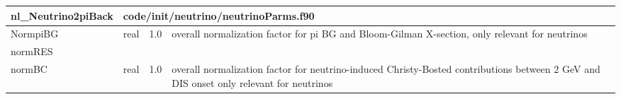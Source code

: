 \documentclass{article}
\begin{document}
\begin{longtable}{llll}
\toprule
\textbf{\large{nl\_Neutrino2piBack}} & \multicolumn{3}{l}{\footnotesize{code/init/neutrino/neutrinoParms.f90}}\\*
\midrule
\endfirsthead
\midrule
\endhead
NormpiBG & \begin{minipage}[t]{2cm}real\end{minipage} & \begin{minipage}[t]{2cm}1.0\end{minipage} & \begin{minipage}[t]{12cm}overall normalization factor for pi BG and Bloom-Gilman X-section, only relevant for neutrinos\end{minipage}\\*
\midrule
normRES & \begin{minipage}[t]{2cm}\end{minipage} & \begin{minipage}[t]{2cm}\end{minipage} & \begin{minipage}[t]{12cm}\end{minipage}\\*
\midrule
normBC & \begin{minipage}[t]{2cm}real\end{minipage} & \begin{minipage}[t]{2cm}1.0\end{minipage} & \begin{minipage}[t]{12cm}overall normalization factor for neutrino-induced Christy-Bosted contributions between 2 GeV and DIS onset only relevant for neutrinos\end{minipage}\\*
\bottomrule
\end{longtable}
{ }



\end{document}
